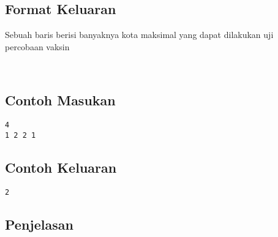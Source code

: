 \documentclass{article}
\begin{document}
\subsection*{Format Keluaran}
Sebuah baris berisi banyaknya kota maksimal yang dapat dilakukan uji percobaan vaksin

\\

\begin{multicols}{2}
\subsection*{Contoh Masukan}
\begin{lstlisting}
4
1 2 2 1
\end{lstlisting}
\columnbreak
\subsection*{Contoh Keluaran}
\begin{lstlisting}
2
\end{lstlisting}
\vfill
\null
\end{multicols}

\subsection*{Penjelasan}

\pagebreak
\end{document}
